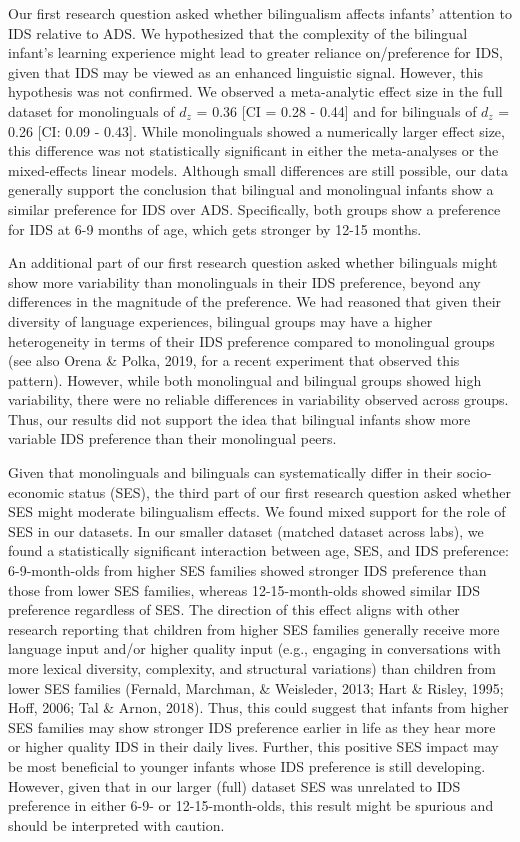 \documentclass[,man,floatsintext]{apa6}
\begin{document}
Our first research question asked whether bilingualism affects infants' attention to IDS relative to ADS. We hypothesized that the complexity of the bilingual infant's learning experience might lead to greater reliance on/preference for IDS, given that IDS may be viewed as an enhanced linguistic signal. However, this hypothesis was not confirmed. We observed a meta-analytic effect size in the full dataset for monolinguals of \(d_z\) =
0.36 {[}CI = 0.28 - 0.44{]} and for bilinguals of \(d_z\) = 0.26 {[}CI: 0.09 - 0.43{]}. While monolinguals showed a numerically larger effect size, this difference was not statistically significant in either the meta-analyses or the mixed-effects linear models. Although small differences are still possible, our data generally support the conclusion that bilingual and monolingual infants show a similar preference for IDS over ADS. Specifically, both groups show a preference for IDS at 6-9 months of age, which gets stronger by 12-15 months.

An additional part of our first research question asked whether bilinguals might show more variability than monolinguals in their IDS preference, beyond any differences in the magnitude of the preference. We had reasoned that given their diversity of language experiences, bilingual groups may have a higher heterogeneity in terms of their IDS preference compared to monolingual groups (see also Orena \& Polka, 2019, for a recent experiment that observed this pattern). However, while both monolingual and bilingual groups showed high variability, there were no reliable differences in variability observed across groups. Thus, our results did not support the idea that bilingual infants show more variable IDS preference than their monolingual peers.

Given that monolinguals and bilinguals can systematically differ in their socio-economic status (SES), the third part of our first research question asked whether SES might moderate bilingualism effects. We found mixed support for the role of SES in our datasets. In our smaller dataset (matched dataset across labs), we found a statistically significant interaction between age, SES, and IDS preference: 6-9-month-olds from higher SES families showed stronger IDS preference than those from lower SES families, whereas 12-15-month-olds showed similar IDS preference regardless of SES. The direction of this effect aligns with other research reporting that children from higher SES families generally receive more language input and/or higher quality input (e.g., engaging in conversations with more lexical diversity, complexity, and structural variations) than children from lower SES families (Fernald, Marchman, \& Weisleder, 2013; Hart \& Risley, 1995; Hoff, 2006; Tal \& Arnon, 2018). Thus, this could suggest that infants from higher SES families may show stronger IDS preference earlier in life as they hear more or higher quality IDS in their daily lives. Further, this positive SES impact may be most beneficial to younger infants whose IDS preference is still developing. However, given that in our larger (full) dataset SES was unrelated to IDS preference in either 6-9- or 12-15-month-olds, this result might be spurious and should be interpreted with caution.
\end{document}
